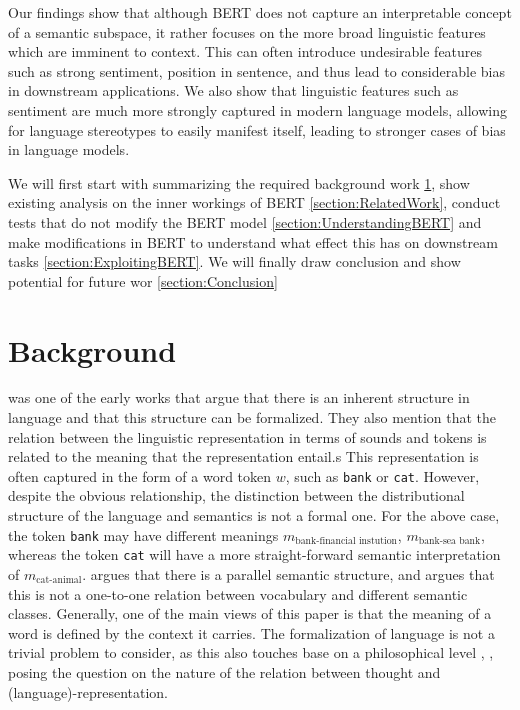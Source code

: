 \documentclass[a4paper,12pt,twoside,openright]{report}
\begin{document}
Our findings show that although BERT does not capture an interpretable concept of a semantic subspace, it rather focuses on the more broad linguistic features which are imminent to context.
This can often introduce undesirable features such as strong sentiment, position in sentence, and thus lead to considerable bias in downstream applications.
We also show that linguistic features such as sentiment are much more strongly captured in modern language models, allowing for language stereotypes to easily manifest itself, leading to stronger cases of bias in language models.

We will first start with summarizing the required background work \ref{section:Background}, show existing analysis on the inner workings of BERT \ref{section:RelatedWork}, conduct tests that do not modify the BERT model \ref{section:UnderstandingBERT} and make modifications in BERT to understand what effect this has on downstream tasks \ref{section:ExploitingBERT}.
We will finally draw conclusion and show potential for future wor \ref{section:Conclusion}



\chapter{Background}\label{section:Background} 

\cite{harris54} was one of the early works that argue that there is an inherent structure in language and that this structure can be formalized.
They also mention that the relation between the linguistic representation in terms of sounds and tokens is related to the meaning that the representation entail.s 
This representation is often captured in the form of a word token $w$, such as \Verb#bank# or \Verb#cat#.
However, despite the obvious relationship, the distinction between the distributional structure of the language and semantics is not a formal one. 
For the above case, the token \Verb#bank# may have different meanings $m_\text{bank-financial instution}$, $m_\text{bank-sea bank}$, whereas the token \Verb#cat# will have a more straight-forward semantic interpretation of $m_\text{cat-animal}$.
\cite{harris54} argues that there is a parallel semantic structure, and argues that this is not a one-to-one relation between vocabulary and different semantic classes.
Generally, one of the main views of this paper is that the meaning of a word is defined by the context it carries.
The formalization of language is not a trivial problem to consider, as this also touches base on a philosophical level \cite{hegel17}, \cite{wittgenstein53}, posing the question on the nature of the relation between thought and (language)-representation.
\end{document}
